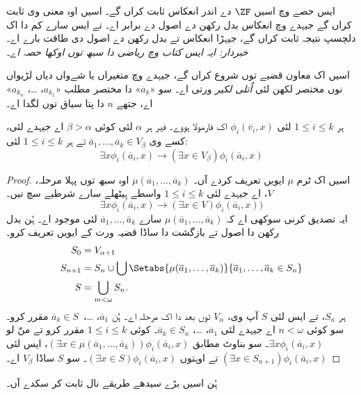 \documentclass[../../../include/open-logic-section]{subfiles}
\begin{document}

ایس حصے وچ اسیں $\ZF$ دے اندر انعکاس ثابت کراں گے۔ اسیں اوہ معنی وی ثابت کراں گے جیہدے وچ انعکاس بدل رکھن دے اصول دے برابر اے۔ تے ایس سارے کم دا اک دلچسپ نتیجہ ثابت کراں گے، جیہڑا انعکاس تے بدل رکھن دے اصول دی طاقت بارے اے۔ \emph{خبردار: ایہ ایس کتاب وچ ریاضی دا سبھ توں اوکھا حصہ اے۔}

اسیں اک معاون قضیے توں شروع کراں گے، جیہدے وچ متغیراں یا شےواں دیاں لڑیواں نوں مختصر لکھن لئی \emph{اُتلی لکیر} ورتی اے۔ سو «$\overline{a}_k$» دا مختصر مطلب «$a_{k_1}$، \dots،
$a_{k_n}$» اے، جتھے $n$ دا پتا سیاق توں لگدا اے۔

\begin{lem}
ہر $1 \leq i \leq k$ لئی $\phi_i(\overline{v}_i, x)$ اک فارمولا ہووے۔ فیر ہر $\alpha$ لئی کوئی $\beta > \alpha$ اے جیہدے لئی، کسے وی $\overline{a}_1,
\ldots, \overline{a}_k \in V_\beta$ تے ہر $1 \leq i \leq k$ لئی:
\[
	\exists x\phi_i(\overline{a}_i, x) \rightarrow (\exists x \in V_\beta) \phi_i(\overline{a}_i, x)
\]
\end{lem}

\begin{proof}
اسیں اک ٹرم $\mu$ ایویں تعریف کردے آں۔ $\mu(\overline{a}_1, \ldots,
\overline{a}_k)$ اوہ سبھ توں پہلا مرحلہ، $V$، اے جیہدے لئی $1 \leq i \leq k$ واسطے ہِیٹھلے سارے شرطیے سچ نیں۔
\[
\exists x\phi_i(\overline{a}_i, x) \rightarrow (\exists x \in V) \phi_i(\overline{a}_i, x))
\]
ایہ تصدیق کرنی سوکھی اے کہ $\mu(\overline{a}_1, \ldots, \overline{a}_k)$ سارے $\overline{a}_1, \ldots, \overline{a}_k$ لئی موجود اے۔ ہُن بدل رکھن دا اصول تے بازگشت دا ساڈا قضیہ ورت کے ایویں تعریف کرو۔
\begin{align*}
	S_0 & = V_{\alpha+1}\\
	S_{n+1} & = S_n \cup \bigcup
	\Setabs{\mu(\overline{a}_1, \ldots, \overline{a}_k)}
	{\overline{a}_1, \ldots, \overline{a}_k \in S_n} \\
	S &= \bigcup_{m < \omega} S_n.
\end{align*}
ہر $S_n$، تے ایس لئی $S$ آپ وی، $V_\alpha$ توں بعد دا اک مرحلہ اے۔ ہُن
$\overline{a}_1$، \dots،~$\overline{a}_k \in S$ مقرر کرو۔ سو کوئی $n <
\omega$ اے جیہدے لئی $\overline{a}_1$، \dots، $\overline{a}_k \in S_n$۔
کوئی $1 \leq i \leq k$ مقرر کرو تے منّ لو $\exists x
\phi_i(\overline{a}_i,x)$۔ سو بناوٹ مطابق $(\exists x \in \mu(\overline{a}_1,
\ldots, \overline{a}_k))\phi_i(\overline{a}_i, x)$، ایس لئی
$(\exists x \in S_{n+1})\phi_i(\overline{a}_i, x)$ تے اوہتوں
$(\exists x \in S)\phi_i(\overline{a}_i, x)$۔ سو $S$ ساڈا $V_\beta$ اے۔
\end{proof}
\noindent
ہُن اسیں  بڑے سیدھے طریقے نال ثابت کر سکدے آں۔
\end{document}
